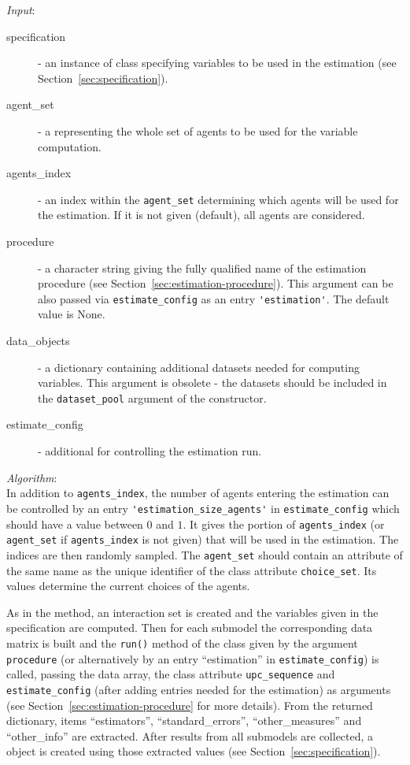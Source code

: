 {{\it Input}:
\begin{description}
\item[specification] - an instance of class 
  specifying variables \variablesindex to be used in the estimation (see Section~\ref{sec:specification}).
\item[agent_set] - a  \datasetindex representing the whole set of agents
  to be used for the variable \variablesindex computation.
\item[agents_index] - an index within the \verb|agent_set| determining which
  agents will be used for the estimation. If it is not given (default), all agents are
  considered.
\item[procedure] - a character string giving the fully qualified name of the
  estimation procedure (see Section~\ref{sec:estimation-procedure}). This argument can be also passed via
  \verb|estimate_config| as an entry \verb|'estimation'|. The default value is None.
\item[data_objects] - a dictionary containing additional datasets \datasetindex
  needed for computing variables. \variablesindex This argument is obsolete - the datasets should be 
  included in the \verb|dataset_pool| argument of the constructor.
\item[estimate_config] - additional  for controlling the
  estimation run.
\end{description}

{\it Algorithm}:~\\[1mm]
In addition to \verb|agents_index|, the number of agents entering the
estimation can be controlled by an entry \verb|'estimation_size_agents'| in
\verb|estimate_config| which should have a value between $0$ and $1$. It gives
the portion of \verb|agents_index| (or \verb|agent_set| if \verb|agents_index|
is not given) that will be used in the estimation. The indices are then
randomly sampled. The \verb|agent_set| should contain an attribute \attributesindex of the same
name as the unique identifier of the class attribute \attributesindex \verb|choice_set|. Its
values determine the current choices of the agents.

As in the  method, an interaction set is created and the
variables \variablesindex given in the specification are computed. Then for each submodel the
corresponding data matrix is built and the \verb|run()| method of the class
given by the argument \verb|procedure| (or alternatively by an entry
``estimation'' in \verb|estimate_config|) is called, passing the data array,
the class attribute \attributesindex \verb|upc_sequence| and \verb|estimate_config| (after
adding entries needed for the estimation) as arguments (see
Section~\ref{sec:estimation-procedure} for more details).  From the returned
dictionary, items ``estimators'', ``standard_errors'', ``other_measures'' and
``other_info'' are extracted. After results from all submodels are collected,
a  \coefficientsindex object is created using those extracted values (see Section~\ref{sec:specification}).

}
